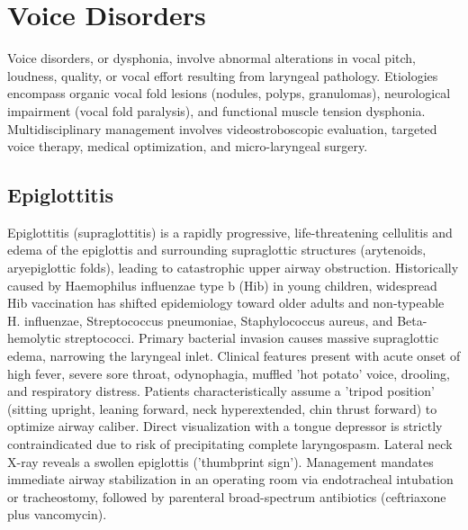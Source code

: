 \section{Voice Disorders}




Voice disorders, or dysphonia, involve abnormal alterations in vocal pitch, loudness, quality, or vocal effort resulting from laryngeal pathology. Etiologies encompass organic vocal fold lesions (nodules, polyps, granulomas), neurological impairment (vocal fold paralysis), and functional muscle tension dysphonia. Multidisciplinary management involves videostroboscopic evaluation, targeted voice therapy, medical optimization, and micro-laryngeal surgery.





\label{sec:Voice Disorders}

\subsection{Epiglottitis}
\label{throat:Epiglottitis}
Epiglottitis (supraglottitis) is a rapidly progressive, life-threatening cellulitis and edema of the epiglottis and surrounding supraglottic structures (arytenoids, aryepiglottic folds), leading to catastrophic upper airway obstruction. Historically caused by Haemophilus influenzae type b (Hib) in young children, widespread Hib vaccination has shifted epidemiology toward older adults and non-typeable H. influenzae, Streptococcus pneumoniae, Staphylococcus aureus, and Beta-hemolytic streptococci. Primary bacterial invasion causes massive supraglottic edema, narrowing the laryngeal inlet. Clinical features present with acute onset of high fever, severe sore throat, odynophagia, muffled 'hot potato' voice, drooling, and respiratory distress. Patients characteristically assume a 'tripod position' (sitting upright, leaning forward, neck hyperextended, chin thrust forward) to optimize airway caliber. Direct visualization with a tongue depressor is strictly contraindicated due to risk of precipitating complete laryngospasm. Lateral neck X-ray reveals a swollen epiglottis ('thumbprint sign'). Management mandates immediate airway stabilization in an operating room via endotracheal intubation or tracheostomy, followed by parenteral broad-spectrum antibiotics (ceftriaxone plus vancomycin).

